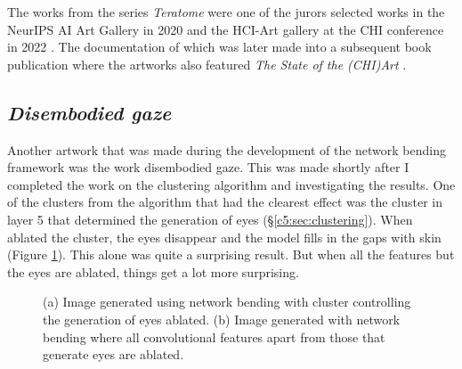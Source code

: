 The works from the series \textit{Teratome} were one of the jurors selected works in the NeurIPS AI Art Gallery in 2020 \citep{broad2020teratome} and the HCI-Art gallery at the CHI conference in 2022 \citep{perry2022art} . 
The documentation of which was later made into a subsequent book publication where the artworks also featured \textit{The State of the (CHI)Art} \citep{sturdee2023chiart}. 

\subsection{\textit{Disembodied gaze}}
\label{c7:subsubsec:disembodied}

Another artwork that was made during the development of the network bending framework was the work disembodied gaze. 
This was made shortly after I completed the work on the clustering algorithm and investigating the results. 
One of the clusters from the algorithm that had the clearest effect was the cluster in layer 5 that determined the generation of eyes (\S \ref{c5:sec:clustering}). 
When ablated the cluster, the eyes disappear and the model fills in the gaps with skin (Figure \ref{fig:c7:eyes-no-eyes}). 
This alone was quite a surprising result. But when all the features but the eyes are ablated, things get a lot more surprising. 

\begin{figure}[!htbp]
    \hfill
    \hfill
    \caption[Network bending eye cluster comparison]{(a) Image generated using network bending with cluster controlling the generation of eyes ablated. (b) Image generated with network bending where all convolutional features apart from those that generate eyes are ablated.}
    \label{fig:c7:eyes-no-eyes}
 \end{figure}

